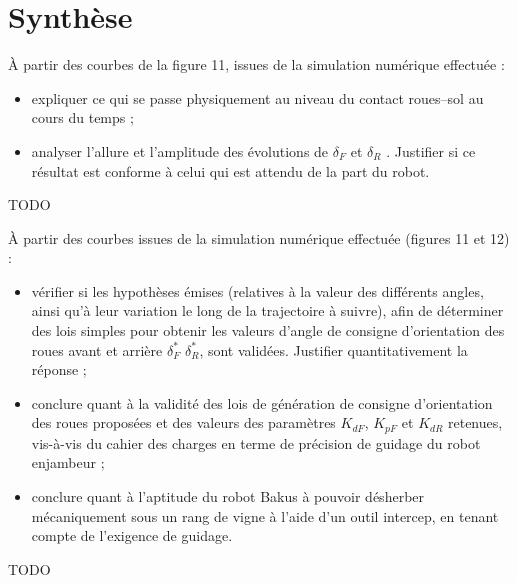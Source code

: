 \documentclass[11pt]{article}
\begin{document}
\section{Synthèse}


\UPSTIquestion  À partir des courbes de la figure 11, issues de la simulation numérique effectuée :
\begin{itemize}
\item expliquer ce qui se passe physiquement au niveau du contact roues–sol au cours du temps ;
\item analyser l’allure et l’amplitude des évolutions de $\delta_F$ et $\delta_R$ . Justifier si ce résultat est conforme à celui qui est attendu de la part du robot.
\end{itemize}

\begin{UPSTIcorrige}
TODO
\end{UPSTIcorrige}



\UPSTIquestion  À partir des courbes issues de la simulation numérique effectuée (figures 11 et 12) :
\begin{itemize}
\item vérifier si les hypothèses émises (relatives à la valeur des différents angles, ainsi qu’à leur variation le long
de la trajectoire à suivre), afin de déterminer des lois simples pour obtenir les valeurs d’angle de consigne
d’orientation des roues avant et arrière $\delta_F^*$ $\delta_R^*$, sont validées. Justifier quantitativement la réponse ;
\item conclure quant à la validité des lois de génération de consigne d’orientation des roues proposées et des valeurs
des paramètres $K_{dF}$, $K_{pF}$ et $K_{dR}$ retenues, vis-à-vis du cahier des charges en terme de précision de guidage du robot enjambeur ;
\item conclure quant à l’aptitude du robot Bakus à pouvoir désherber mécaniquement sous un rang de vigne à
l’aide d’un outil intercep, en tenant compte de l’exigence de guidage.
\end{itemize}

\begin{UPSTIcorrige}
TODO
\end{UPSTIcorrige}
\end{document}

